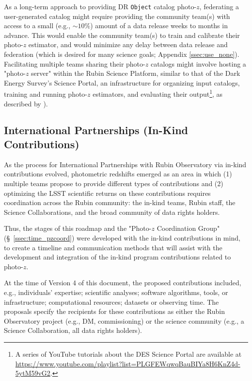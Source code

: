 \documentclass[DM,authoryear,toc]{lsstdoc}
\begin{document}
As a long-term approach to providing DR {\tt Object} catalog photo-$z$, federating a user-generated catalog might require providing the community team(s) with access to a small (e.g., $\sim10\%$) amount of a data release weeks to months in advance.
This would enable the community team(s) to train and calibrate their photo-$z$ estimator, and would minimize any delay between data release and federation (which is desired for many science goals; Appendix \ref{ssec:use_none}).
Facilitating multiple teams sharing their photo-$z$ catalogs might involve hosting a "photo-$z$ server" within the Rubin Science Platform, similar to that of the Dark Energy Survey's Science Portal, an infrastructure for organizing input catalogs, training and running photo-$z$ estimators, and evaluating their output\footnote{A series of YouTube tutorials about the DES Science Portal are available at \url{https://www.youtube.com/playlist?list=PLGFEWqwqBauBIYa8H6KnZ4d-5ytM59vG2}.}, as described by \citet{2018A&C....25...58G}).

\subsection{International Partnerships (In-Kind Contributions)}\label{ssec:time_inkind}

As the process for International Partnerships with Rubin Observatory via in-kind contributions evolved, photometric redshifts emerged as an area in which (1) multiple teams propose to provide different types of contributions and (2) optimizing the LSST scientific returns on these contributions requires coordination across the Rubin community: the in-kind teams, Rubin staff, the Science Collaborations, and the broad community of data rights holders.

Thus, the stages of this roadmap and the "Photo-$z$ Coordination Group" (\S~\ref{ssec:time_pzcoord}) were developed with the in-kind contributions in mind, to create a timeline and communication methods that will assist with the development and integration of the in-kind program contributions related to photo-$z$.

At the time of Version 4 of this document, the proposed contributions included, e.g., individuals' expertise; scientific analyses; software algorithms, tools, or infrastructure; computational resources; datasets or observing time.
The proposals specify the recipients for these contributions as either the Rubin Observatory project (e.g., DM, commissioning) or the science community (e.g., a Science Collaboration, all data rights holders).
\end{document}
